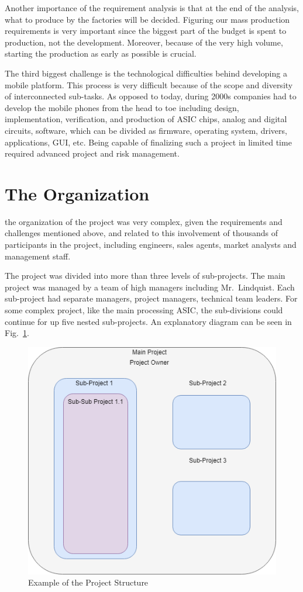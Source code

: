 \documentclass[journal]{IEEEtran}
\begin{document}
Another importance of the requirement analysis is that at the end of the analysis, what to produce by the factories will be decided. Figuring our mass production requirements is very important since the biggest part of the budget is spent to production, not the development. Moreover, because of the very high volume, starting the production as early as possible is crucial. 

The third biggest challenge is the technological difficulties behind developing a mobile platform. This process is very difficult because of the scope and diversity of interconnected sub-tasks. As opposed to today, during 2000s companies had to develop the mobile phones from the head to toe including design, implementation, verification, and production of ASIC chips, analog and digital circuits, software, which can be divided as firmware, operating system, drivers, applications, GUI, etc. Being capable of finalizing such a project in limited time required advanced project and risk management. 

\section{The Organization}
the organization of the project was very complex, given the requirements and challenges mentioned above, and related to this involvement of thousands of participants in the project, including engineers, sales agents, market analysts and management staff. 

The project was divided into more than three levels of sub-projects. The main project was managed by a team of high managers including Mr.~Lindquist. Each sub-project had separate managers, project managers, technical team leaders. For some complex project, like the main processing ASIC, the sub-divisions could continue for up five nested sub-projects. An explanatory diagram can be seen in Fig.~\ref{fig:project_structure}.

\begin{figure}[h]
    \centering
    \includegraphics[width=0.8\linewidth]{project_structure.png}
    \caption{Example of the Project Structure}
    \label{fig:project_structure}
\end{figure}
\end{document}
